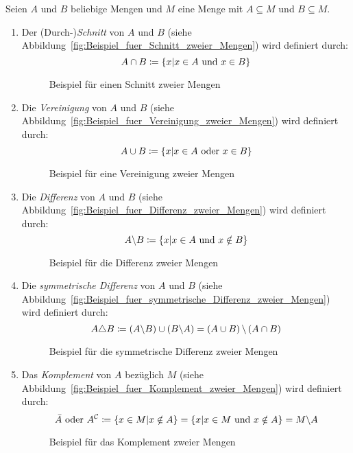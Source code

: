 \begin{definition}[Mengenoperationen]
Seien $A$ und $B$ beliebige Mengen und $M$ eine Menge mit $A \subseteq M$ und $B \subseteq M$.
\begin{enumerate}
\item Der (Durch-)\emph{Schnitt} von $A$ und $B$ (siehe Abbildung~\vref{fig:Beispiel_fuer_Schnitt_zweier_Mengen}) wird definiert durch:
	\[A \cap B \mathrel{\mathop:\!\!=} \left\{x \vert x \in A \text{ und } x \in B\right\}\]
	\begin{figure}[htb]
	\centering
	
	\caption{Beispiel für einen Schnitt zweier Mengen}
	\label{fig:Beispiel_fuer_Schnitt_zweier_Mengen}
	\end{figure}

\item Die \emph{Vereinigung} von $A$ und $B$ (siehe Abbildung~\vref{fig:Beispiel_fuer_Vereinigung_zweier_Mengen}) wird definiert durch:
	\[A \cup B \mathrel{\mathop:\!\!=} \left\{x \vert x \in A \text{ oder } x \in B\right\}\]
	\begin{figure}[htb]
	\centering
	
	\caption{Beispiel für eine Vereinigung zweier Mengen}
	\label{fig:Beispiel_fuer_Vereinigung_zweier_Mengen}
	\end{figure}

\item Die \emph{Differenz} von $A$ und $B$ (siehe Abbildung~\vref{fig:Beispiel_fuer_Differenz_zweier_Mengen}) wird definiert durch:
	\[A \backslash B \mathrel{\mathop:\!\!=} \left\{x \vert x \in A \text{ und } x \notin B\right\}\]
	\begin{figure}[htb]
	\centering
	
	\caption{Beispiel für die Differenz zweier Mengen}
	\label{fig:Beispiel_fuer_Differenz_zweier_Mengen}
	\end{figure}

\item Die \emph{symmetrische Differenz} von $A$ und $B$ (siehe Abbildung~\vref{fig:Beispiel_fuer_symmetrische_Differenz_zweier_Mengen}) wird definiert durch:
	\[A \triangle B \mathrel{\mathop:\!\!=} \left(A \backslash B\right) \cup \left(B \backslash A\right) = \left(A \cup B\right) \backslash \left(A \cap B\right)\]
	\begin{figure}[htb]
	\centering
	
	\caption{Beispiel für die symmetrische Differenz zweier Mengen}
	\label{fig:Beispiel_fuer_symmetrische_Differenz_zweier_Mengen}
	\end{figure}

\item Das \emph{Komplement} von $A$ bezüglich $M$ (siehe Abbildung~\vref{fig:Beispiel_fuer_Komplement_zweier_Mengen}) wird definiert durch:
	\[\bar{A} \text{ oder } A^{\mathcal{C}} \mathrel{\mathop:\!\!=} \left\{x \in M \vert x \notin A\right\} = \left\{x \vert x \in M \text{ und } x \notin A\right\} = M \backslash A\]
	\begin{figure}[htb]
	\centering
	
	\caption{Beispiel für das Komplement zweier Mengen}
	\label{fig:Beispiel_fuer_Komplement_zweier_Mengen}
	\end{figure}


\end{enumerate}
\end{definition}
